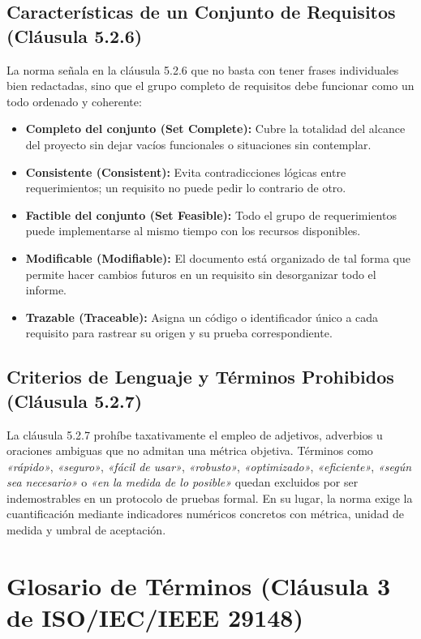 \documentclass[11pt, a4paper]{article}
\begin{document}
\subsection{Características de un Conjunto de Requisitos (Cláusula 5.2.6)}
La norma señala en la cláusula 5.2.6 \cite{iso29148} que no basta con tener frases individuales bien redactadas, sino que el grupo completo de requisitos debe funcionar como un todo ordenado y coherente:
\begin{itemize}
    \item \textbf{Completo del conjunto (Set Complete):} Cubre la totalidad del alcance del proyecto sin dejar vacíos funcionales o situaciones sin contemplar.
    \item \textbf{Consistente (Consistent):} Evita contradicciones lógicas entre requerimientos; un requisito no puede pedir lo contrario de otro.
    \item \textbf{Factible del conjunto (Set Feasible):} Todo el grupo de requerimientos puede implementarse al mismo tiempo con los recursos disponibles.
    \item \textbf{Modificable (Modifiable):} El documento está organizado de tal forma que permite hacer cambios futuros en un requisito sin desorganizar todo el informe.
    \item \textbf{Trazable (Traceable):} Asigna un código o identificador único a cada requisito para rastrear su origen y su prueba correspondiente.
\end{itemize}

\subsection{Criterios de Lenguaje y Términos Prohibidos (Cláusula 5.2.7)}
La cláusula 5.2.7 \cite{iso29148} prohíbe taxativamente el empleo de adjetivos, adverbios u oraciones ambiguas que no admitan una métrica objetiva. Términos como \textit{«rápido»}, \textit{«seguro»}, \textit{«fácil de usar»}, \textit{«robusto»}, \textit{«optimizado»}, \textit{«eficiente»}, \textit{«según sea necesario»} o \textit{«en la medida de lo posible»} quedan excluidos por ser indemostrables en un protocolo de pruebas formal. En su lugar, la norma exige la cuantificación mediante indicadores numéricos concretos con métrica, unidad de medida y umbral de aceptación.

\section{Glosario de Términos (Cláusula 3 de ISO/IEC/IEEE 29148)}
\end{document}
